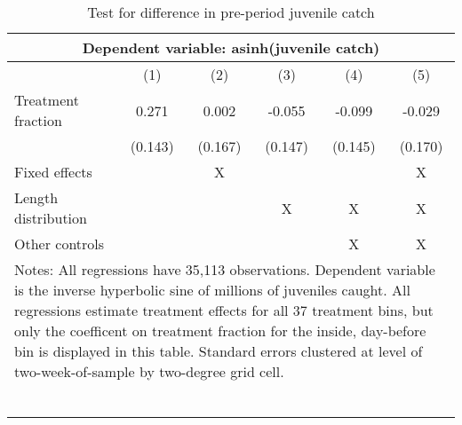 \begin{table}[tb]
\centering
\caption{Test for difference in pre-period juvenile catch} 
\label{preperiod_juvenilecatch}
\begin{tabular}{lccccc}
   \toprule \multicolumn{6}{c}{Dependent variable: asinh(juvenile catch)} \\ \midrule  & (1) & (2) & (3) & (4) & (5) \\ 
    \midrule Treatment fraction & 0.271 & 0.002 & -0.055 & -0.099 & -0.029 \\ 
   & (0.143) & (0.167) & (0.147) & (0.145) & (0.170) \\ 
    \midrule Fixed effects & & X & & & X\\  Length distribution & & & X & X & X \\ Other controls & & & & X & X \\ \bottomrule \multicolumn{6}{l}{\multirow{2}{12cm}{Notes: All regressions have 35,113 observations. Dependent variable is the inverse hyperbolic sine of millions of juveniles caught. All regressions estimate treatment effects for all 37 treatment bins, but only the coefficent on treatment fraction for the inside, day-before bin is displayed in this table. Standard errors clustered at level of two-week-of-sample by two-degree grid cell.}} \\\\\\\\\\\\\\\\ \end{tabular}
\end{table}
